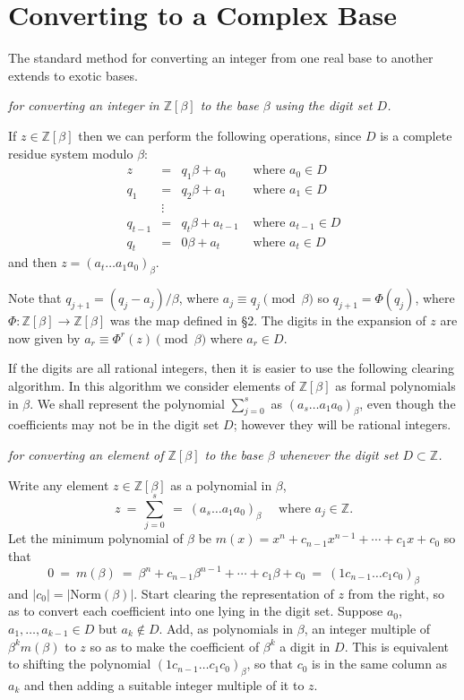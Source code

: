 \documentclass[12pt]{article}
\newcommand{\Z}{\mathbb{Z}}
\begin{document}
\section{Converting to a Complex Base}

The standard method for converting an integer from one real base to another
extends to exotic bases.
\medskip

 {\it
for converting an integer in $\Z[\beta]$ to the base $\beta$ using the digit set $D$.

\noindent If $z\in\Z[\beta]$ then we can perform the following operations, since $D$ is a complete residue system modulo $\beta$:
$$
\begin{array}{rcll}
z&=& q_1\beta+a_0 & \mbox{ where }a_0\in D\\
q_1&=& q_2\beta+a_1 & \mbox{ where }a_1\in D\\
&\vdots&\\
q_{t-1}&=& q_t\beta+a_{t-1} & \mbox{ where }a_{t-1}\in D\\
q_t&=& 0\beta+a_t & \mbox{ where }a_t\in D
\end{array}
$$
and then $z= (a_t\ldots a_1a_0)_{\beta}$.
}
\medskip

    Note that $q_{j+1}=(q_j-a_j)/\beta$, where $a_j \equiv q_j \pmod{\beta}$ so $q_{j+1}=\Phi(q_j)$,
where $\Phi:\Z[\beta]\rightarrow\Z[\beta]$ was the map defined in \S2. 
The digits in the expansion
of $z$ are now given by $a_r \equiv \Phi^r(z) \pmod{\beta}$ where $a_r\in D$.

    If the digits are all rational integers, then it is easier to use the following clearing algorithm. 
In this algorithm we consider elements of $\Z[\beta]$ as
formal polynomials in $\beta$. We shall represent the polynomial $\sum_{j=0}^s$ as
$(a_s\ldots a_1a_0)_{\beta}$, even though the coefficients may not be in the digit set $D$; however they will be rational integers.

\medskip

 {\it
for converting an element of $\Z[\beta]$ to the base $\beta$ whenever the digit set $D\subset\Z$.

\noindent Write any element $z\in\Z[\beta]$ as a polynomial in $\beta$,
$$
z \ = \ \sum_{j=0}^s  \ = \ (a_s\ldots a_1a_0)_{\beta}\quad\mbox{ where } a_j\in\Z.
$$
Let the minimum polynomial of $\beta$ be 
$m(x) = x^n+c_{n-1}x^{n-1}+\cdots+c_1x+c_0$
so that
$$
0 \ = \ m(\beta) \ = \ \beta^n+c_{n-1}\beta^{n-1}+\cdots+c_1\beta+c_0 \ = \ 
(1c_{n-1}\ldots c_1c_0)_{\beta}
$$
and $|c_0|=|\mbox{Norm}(\beta)|$. 
Start clearing the representation of $z$ from the right,
so as to convert each coefficient into one lying in the digit set.  
Suppose
$a_0$, $a_1,\ldots,a_{k-1}\in D$ but $a_k\notin D$.  
Add, as polynomials in $\beta$, an integer
multiple of $\beta^km(\beta)$ to $z$ so as to make the coefficient of $\beta^k$ a digit in $D$.
This is equivalent to shifting the polynomial $(1c_{n-1}\ldots c_1c_0)_{\beta}$, so that $c_0$ is
in the same column as $a_k$ and then adding a suitable integer multiple of it
to $z$.
}
\medskip
\end{document}
